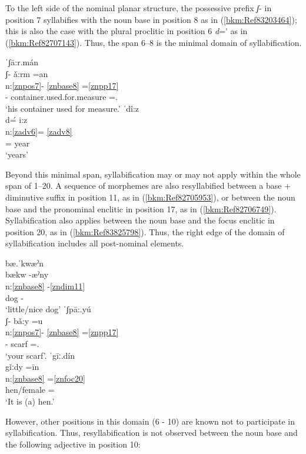 \documentclass[output=paper]{langscibook}
\begin{document}
To the left side of the nominal planar structure, the possessive prefix \textit{ʃ}- in position 7 syllabifies with the noun base in position 8 as in (\ref{bkm:Ref83203464}); this is also the case with the plural proclitic in position 6 \textit{d}=\'{} as in (\ref{bkm:Ref82707143}). Thus, the span 6–8 is the minimal domain of syllabification.  

\ea\label{bkm:Ref83203464}
{ˈʃā:r.mán}\\
\glll ʃ{}- ǎ:rm =an\\
n:\ref{znpos7}- \ref{znbase8} =\ref{znpp17}\\
\Poss{}- container.used.for.measure =\Third\Sg{}.\Inf{}\\
\glt `his container used for measure.'
\ex\label{bkm:Ref82707143}
{ˈdî:z}\\
\glll d\'{=} i:z\\
n:\ref{zadv6}= \ref{zadv8}\\
\Pl{}= year\\
\glt `years'
\z

Beyond this minimal span, syllabification may or may not apply within the whole span of 1--20. A sequence of morphemes are also resyllabified between a base + diminutive suffix in position 11, as in (\ref{bkm:Ref82705953}), or between the noun base and the pronominal enclitic in position 17, as in (\ref{bkm:Ref82706749}). Syllabification also applies between the noun base and the focus enclitic in position 20, as in (\ref{bkm:Ref83825798}). Thus, the right edge of the domain of syllabification includes all post-nominal elements.

\ea\label{bkm:Ref82705953}
{bæ.ˈkwæˀn}\\
\glll bækw -æˀny\\
n:\ref{znbase8}  -\ref{zndim11}\\
dog -\Dim{}\\
\glt `little/nice dog'
\ex\label{bkm:Ref82706749}
{ˈʃpā:.yú}\\
\glll ʃ{}- bǎ:y =u\\
n:\ref{znpos7}- \ref{znbase8} =\ref{znpp17}\\
\Poss{}- scarf =\Second\Sg{}.\Inf{}\\
\glt `your scarf'.
\ex\label{bkm:Ref83825798}
{ˈgīː.dín}\\
\glll gǐːdy =īn\\
n:\ref{znbase8}  =\ref{znfoc20}\\
hen/female =\Foc{}\\
\glt `It is (a) hen.'
\z

However, other positions in this domain (6 - 10) are known not to participate in syllabification. Thus, resyllabification is not observed between the noun base and the following adjective in position 10: 
\end{document}
